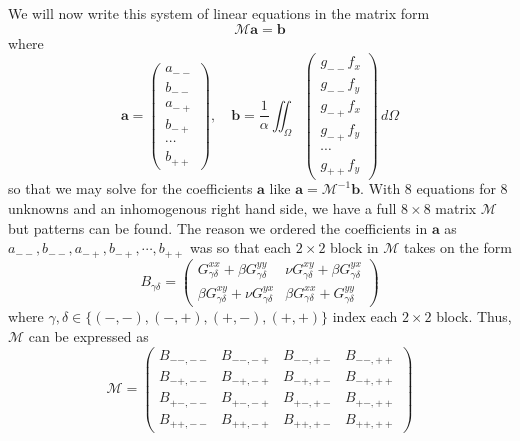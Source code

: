 \documentclass[11pt]{article}
\begin{document}
We will now write this system of linear equations in the matrix form
\begin{equation}
\mathcal{M}\bm{a} = \bm{b}
\end{equation}
where
\begin{equation}
  \bm{a} =
    \begin{pmatrix}
      a_{--} \\
      b_{--} \\
      a_{-+} \\
      b_{-+} \\
      \cdots \\
      b_{++}
    \end{pmatrix}
  , \quad
  \bm{b} = \frac{1}{\alpha} \iint_\Omega
    \begin{pmatrix}
      g_{--}f_x \\
      g_{--}f_y \\
      g_{-+}f_x \\
      g_{-+}f_y \\
      \cdots \\
      g_{++}f_y
    \end{pmatrix}  
  \, d\Omega
\end{equation}
so that we may solve for the coefficients $\bm{a}$ like $\bm{a} = \mathcal{M}^{-1}\bm{b}$. With 8 equations for 8 unknowns and an inhomogenous right hand side, we have a full $8\times8$ matrix $\mathcal{M}$ but patterns can be found. The reason we ordered the coefficients in $\bm{a}$ as $a_{--}, b_{--}, a_{-+}, b_{-+}, \cdots, b_{++}$ was so that each $2\times2$ block in $\mathcal{M}$ takes on the form
\begin{equation}
  B_{\gamma\delta} =
  \begin{pmatrix}
    G_{\gamma\delta}^{xx} + \beta G_{\gamma\delta}^{yy}
      & \nu G_{\gamma\delta}^{xy} + \beta G_{\gamma\delta}^{yx} \\
    \beta G_{\gamma\delta}^{xy} + \nu G_{\gamma\delta}^{yx}
      & \beta G_{\gamma\delta}^{xx} + G_{\gamma\delta}^{yy}
    \end{pmatrix}
\end{equation}
where $\gamma,\delta \in \{(-,-), (-,+), (+,-), (+,+) \}$ index each $2\times2$ block. Thus, $\mathcal{M}$ can be expressed as
\begin{equation}
  \mathcal{M} =
  \begin{pmatrix}
    B_{--,--} & B_{--,-+} & B_{--,+-} & B_{--,++} \\
    B_{-+,--} & B_{-+,-+} & B_{-+,+-} & B_{-+,++} \\
    B_{+-,--} & B_{+-,-+} & B_{+-,+-} & B_{+-,++} \\
    B_{++,--} & B_{++,-+} & B_{++,+-} & B_{++,++}
  \end{pmatrix}
\end{equation}
\end{document}
